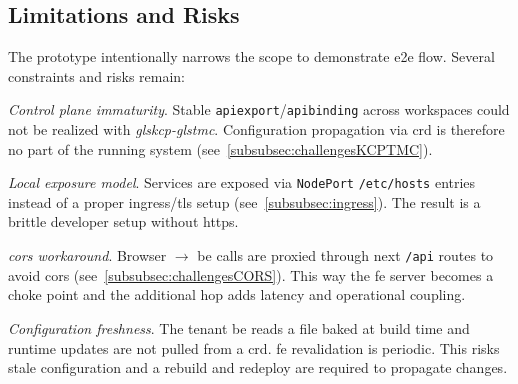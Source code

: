 \documentclass[11pt, a4paper, oneside, listof=totoc]{scrartcl}
\begin{document}
        \subsection{Limitations and Risks}\label{subsec:limitationsAndRisks}
            The prototype intentionally narrows the scope to demonstrate \gls{e2e} flow.
            Several constraints and risks remain:
            \begin{enumerate}[label={[\arabic*]:},
                    ref=Challenge~\arabic*,
                    leftmargin=*,
                    itemsep=0.6\baselineskip]

                    \item\label{chal:controlPlaneImmaturity}
                        \textit{Control plane immaturity}.
                        Stable \texttt{\gls{apiexport}}/\texttt{\gls{apibinding}} across workspaces could not be
                        realized with \emph{gls{kcp}-gls{tmc}}.
                        Configuration propagation via \gls{crd} is therefore no part of the running
                        system (see~\autoref{subsubsec:challengesKCPTMC}).

                    \item\label{chal:localExposureModel}
                        \textit{Local exposure model}.
                        Services are exposed via \texttt{NodePort} \texttt{/etc/hosts} entries
                        instead of a proper \gls{ingress}/\gls{tls} setup
                        (see~\autoref{subsubsec:ingress}).
                        The result is a brittle developer setup without \gls{https}.

                    \item\label{chal:corsWorkaround}
                        \textit{\gls{cors} workaround}.
                        Browser $\rightarrow$ \gls{be} calls are proxied through \gls{next}
                        \texttt{/api} routes to avoid \gls{cors}
                        (see~\autoref{subsubsec:challengesCORS}).
                        This way the \gls{fe} server becomes a choke point and the additional hop
                        adds latency and operational coupling.

                    \item\label{chal:configFreshness}
                        \textit{Configuration freshness}.
                        The tenant \gls{be} reads a file baked at build time and runtime updates are
                        not pulled from a \gls{crd}.
                        \gls{fe} revalidation is periodic.
                        This risks stale configuration and a rebuild and redeploy are required to
                        propagate changes.


\end{enumerate}
\end{document}
